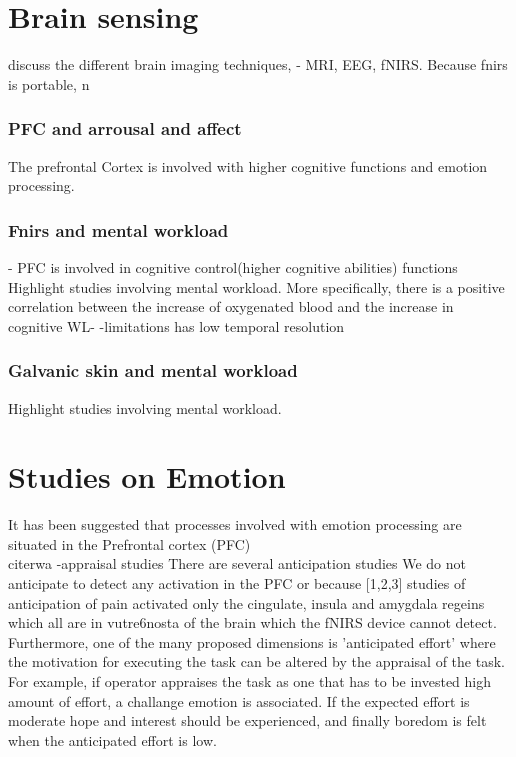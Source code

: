 \documentclass[a4paper]{report}
\begin{document}
 
	\section{Brain sensing}
		discuss the different brain imaging techniques, - MRI, EEG, fNIRS. Because fnirs is portable, n
			\subsubsection{PFC and arrousal and affect}
			The prefrontal Cortex is involved with higher cognitive functions and emotion processing.
			\subsubsection{Fnirs and mental workload}
			- PFC is involved in cognitive control(higher cognitive abilities) functions \cite{fawfa,dawda,dawwd}
			Highlight studies involving mental workload.
			More specifically,
			there is a positive correlation between the increase of oxygenated blood and the
			increase in cognitive WL- 
			-limitations
			has low temporal resolution
			\subsubsection{Galvanic skin and mental workload}
			Highlight studies involving mental workload.

	\section{Studies on Emotion}
			It has been suggested that processes involved with emotion processing are situated in the Prefrontal cortex (PFC) \\cite{rwa}
			-appraisal studies
			There are several anticipation studies
			We do not anticipate to detect any activation in the PFC or because [1,2,3] studies of anticipation of pain activated only the cingulate, insula and amygdala regeins which all are in vutre6nosta of the brain which the fNIRS device cannot detect.
			 Furthermore, one of the many proposed dimensions is 'anticipated effort'\cite{smith1985patterns} where the motivation for executing the task can be altered by the appraisal of the task. For example, if operator appraises the task as one that has to be invested high amount of effort, a challange emotion is associated. If the expected effort is moderate hope and interest should be experienced, and finally boredom is felt when the anticipated effort is low. 
			
\end{document}
